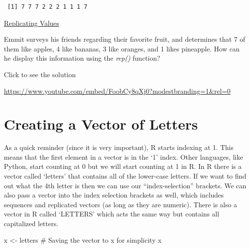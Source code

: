 \documentclass[
  letterpaper,
  DIV=11,
  numbers=noendperiod]{scrreprt}
\newenvironment{Shaded}{\begin{snugshade}}{\end{snugshade}}
\newcommand{\CommentTok}[1]{\textcolor[rgb]{0.37,0.37,0.37}{#1}}
\newcommand{\NormalTok}[1]{\textcolor[rgb]{0.00,0.23,0.31}{#1}}
\newcommand{\OtherTok}[1]{\textcolor[rgb]{0.00,0.23,0.31}{#1}}
\begin{document}
\begin{verbatim}
 [1] 7 7 7 2 2 2 1 1 1 7
\end{verbatim}

\begin{watch}{}{}
    \href{https://youtu.be/OGBhjbDChgQ}{Replicating Values}
\end{watch}

\begin{tcolorbox}[enhanced jigsaw, colbacktitle=quarto-callout-tip-color!10!white, breakable, bottomrule=.15mm, colframe=quarto-callout-tip-color-frame, left=2mm, opacitybacktitle=0.6, title=\textcolor{quarto-callout-tip-color}{\faLightbulb}\hspace{0.5em}{Try it Out}, leftrule=.75mm, opacityback=0, rightrule=.15mm, titlerule=0mm, bottomtitle=1mm, colback=white, toprule=.15mm, arc=.35mm, toptitle=1mm, coltitle=black]

Emmit surveys his friends regarding their favorite fruit, and determines
that 7 of them like apples, 4 like bananas, 3 like oranges, and 1 likes
pineapple. How can he display this information using the \emph{rep()}
function?

Click to see the solution

\url{https://www.youtube.com/embed/FoobCy8qXj0?modestbranding=1&rel=0}

\end{tcolorbox}

\section{Creating a Vector of
Letters}\label{creating-a-vector-of-letters}

As a quick reminder (since it is very important), R starts indexing at
1. This means that the first element in a vector is in the `1' index.
Other languages, like Python, start counting at 0 but we will start
counting at 1 in R. In R there is a vector called `letters' that
contains all of the lower-case letters. If we want to find out what the
4th letter is then we can use our ``index-selection'' brackets. We can
also pass a vector into the index selection brackets as well, which
includes sequences and replicated vectors (as long as they are numeric).
There is also a vector in R called `LETTERS' which acts the same way but
contains all capitalized letters.

\begin{Shaded}
\begin{Highlighting}[]
\NormalTok{x }\OtherTok{\textless{}{-}}\NormalTok{ letters }\CommentTok{\# Saving the vector to \textquotesingle{}x\textquotesingle{} for simplicity}
\NormalTok{x}
\end{Highlighting}
\end{Shaded}
\end{document}
